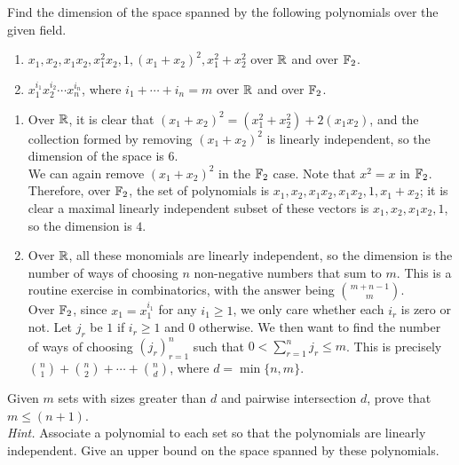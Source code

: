 \documentclass{article}
\begin{document}
	\begin{exercise}
		\label{ex:2.1}
		Find the dimension of the space spanned by the following polynomials over the given field.
		\begin{enumerate}[label=(\alph*)]
			\item $x_1, x_2, x_1x_2, x_1^2x_2, 1, (x_1+x_2)^2, x_1^2+x_2^2$ over $\mathbb{R}$ and over $\mathbb{F}_2$.
			\item $x_1^{i_1}x_2^{i_2}\cdots x_n^{i_n}$, where $i_1 + \cdots + i_n = m$ over $\mathbb{R}$ and over $\mathbb{F}_2$.
		\end{enumerate}
	\end{exercise}
	\begin{solution*}
		\begin{enumerate}[label=(\alph*)]
			\item Over $\mathbb{R}$, it is clear that $(x_1 + x_2)^2 = (x_1^2 + x_2^2) + 2(x_1x_2)$, and the collection formed by removing $(x_1 + x_2)^2$ is linearly independent, so the dimension of the space is $6$.\\
			We can again remove $(x_1+x_2)^2$ in the $\mathbb{F}_2$ case. Note that $x^2 = x$ in $\mathbb{F}_2$. Therefore, over $\mathbb{F}_2$, the set of polynomials is $x_1, x_2, x_1x_2, x_1x_2, 1, x_1+x_2$; it is clear a maximal linearly independent subset of these vectors is $x_1, x_2, x_1x_2, 1$, so the dimension is $4$.

			\item Over $\mathbb{R}$, all these monomials are linearly independent, so the dimension is the number of ways of choosing $n$ non-negative numbers that sum to $m$. This is a routine exercise in combinatorics, with the answer being $\binom{m+n-1}{m}$.\\
			Over $\mathbb{F}_2$, since $x_1 = x_1^{i_1}$ for any $i_1 \ge 1$, we only care whether each $i_r$ is zero or not. Let $j_r$ be $1$ if $i_r \ge 1$ and $0$ otherwise. We then want to find the number of ways of choosing $(j_r)_{r=1}^n$ such that $0 < \sum_{r=1}^{n} j_r \le m$. This is precisely $\binom{n}{1} + \binom{n}{2} + \cdots + \binom{n}{d}$, where $d = \min\{n,m\}$.
		\end{enumerate}
	\end{solution*}

	\begin{exercise}
		Given $m$ sets with sizes greater than $d$ and pairwise intersection $d$, prove that $m \le (n+1)$.\\
		\emph{Hint.} \textcolor{gray!20}{Associate a polynomial to each set so that the polynomials are linearly independent. Give an upper bound on the space spanned by these polynomials.}
	\end{exercise}
	\begin{solution*}
		
	\end{solution*}
\end{document}
